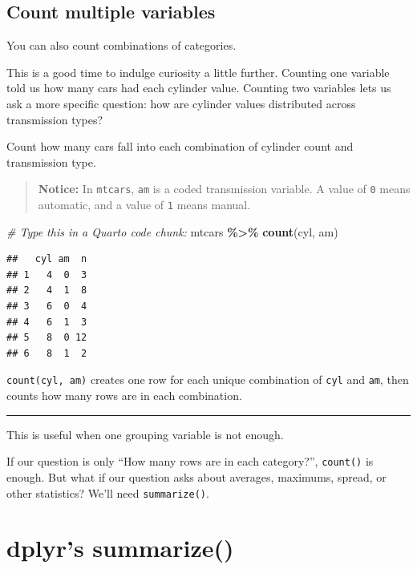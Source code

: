 \documentclass[
]{article}
\newenvironment{Shaded}{\begin{snugshade}}{\end{snugshade}}
\newcommand{\CommentTok}[1]{\textcolor[rgb]{0.56,0.35,0.01}{\textit{#1}}}
\newcommand{\FunctionTok}[1]{\textcolor[rgb]{0.13,0.29,0.53}{\textbf{#1}}}
\newcommand{\NormalTok}[1]{#1}
\newcommand{\SpecialCharTok}[1]{\textcolor[rgb]{0.81,0.36,0.00}{\textbf{#1}}}
\begin{document}
\subsection{Count multiple variables}\label{count-multiple-variables}

You can also count combinations of categories.

This is a good time to indulge curiosity a little further. Counting one
variable told us how many cars had each cylinder value. Counting two
variables lets us ask a more specific question: how are cylinder values
distributed across transmission types?

Count how many cars fall into each combination of cylinder count and
transmission type.

\begin{quote}
\textbf{Notice:} In \texttt{mtcars}, \texttt{am} is a coded transmission
variable. A value of \texttt{0} means automatic, and a value of
\texttt{1} means manual.
\end{quote}

\begin{Shaded}
\begin{Highlighting}[]
\CommentTok{\#  Type this in a Quarto code chunk:}
\NormalTok{mtcars }\SpecialCharTok{\%\textgreater{}\%}
  \FunctionTok{count}\NormalTok{(cyl, am)}
\end{Highlighting}
\end{Shaded}

\begin{verbatim}
##   cyl am  n
## 1   4  0  3
## 2   4  1  8
## 3   6  0  4
## 4   6  1  3
## 5   8  0 12
## 6   8  1  2
\end{verbatim}

\texttt{count(cyl,\ am)} creates one row for each unique combination of
\texttt{cyl} and \texttt{am}, then counts how many rows are in each
combination.

\begin{center}\rule{0.5\linewidth}{0.5pt}\end{center}

This is useful when one grouping variable is not enough.

If our question is only ``How many rows are in each category?'',
\texttt{count()} is enough. But what if our question asks about
averages, maximums, spread, or other statistics? We'll need
\texttt{summarize()}.

\section{dplyr's summarize()}\label{dplyrs-summarize}
\end{document}
